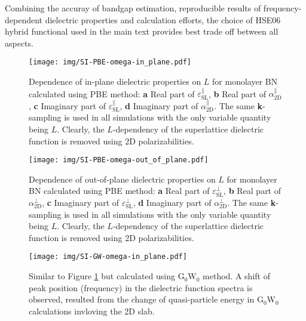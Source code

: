 \documentclass[journal=ancac3,email=true,hyperref=true,keywords=false]{achemso}
\begin{document}
Combining the accuray of bandgap estimation, reproducible results of
frequency-dependent dielectric properties and calculation efforts, the
choice of HSE06 hybrid functional used in the main text provides
best trade off between all aspects.

\begin{figure}[htbp]
  \centering
 \texttt{[image: img/SI-PBE-omega-in\_plane.pdf]}
 \caption{Dependence of in-plane dielectric properties on $L$ for
   monolayer BN calculated using PBE method: \textbf{a} Real part of
   $\varepsilon_{\mathrm{SL}}^{\parallel}$, \textbf{b} Real part of
   $\alpha_{\mathrm{2D}}^{\parallel}$, \textbf{c} Imaginary part of
   $\varepsilon_{\mathrm{SL}}^{\parallel}$, \textbf{d} Imaginary part
   of $\alpha_{\mathrm{2D}}^{\parallel}$.  The same {\bf k}-sampling
   is used in all simulations with the only variable quantity being
   $L$. Clearly, the $L$-dependency of the superlattice dielectric
   function is removed using 2D polarizabilities.}
  \label{fig:PBE-omega-in}
\end{figure}

\begin{figure}[htbp]
  \centering
  \texttt{[image: img/SI-PBE-omega-out\_of\_plane.pdf]}
  \caption{Dependence of out-of-plane dielectric properties on $L$ for
    monolayer BN calculated using PBE method: \textbf{a} Real part of
    $\varepsilon_{\mathrm{SL}}^{\perp}$, \textbf{b} Real part of
    $\alpha_{\mathrm{2D}}^{\perp}$, \textbf{c} Imaginary part of
    $\varepsilon_{\mathrm{SL}}^{\perp}$, \textbf{d} Imaginary part of
    $\alpha_{\mathrm{2D}}^{\perp}$.  The same {\bf k}-sampling is used
    in all simulations with the only variable quantity being
    $L$. Clearly, the $L$-dependency of the superlattice dielectric
    function is removed using 2D polarizabilities.}
  \label{fig:PBE-omega-out}
\end{figure}



\begin{figure}[htbp]
  \centering
 \texttt{[image: img/SI-GW-omega-in\_plane.pdf]}
 \caption{Similar to Figure \ref{fig:PBE-omega-in} but calculated
   using G$_{0}$W$_{0}$ method. A shift of peak position (frequency)
   in the dielectric function spectra is observed, resulted from the
   change of quasi-particle energy in G$_{0}$W$_{0}$ calculations
   invloving the 2D slab.}
  \label{fig:GW-omega-in}
\end{figure}
\end{document}
